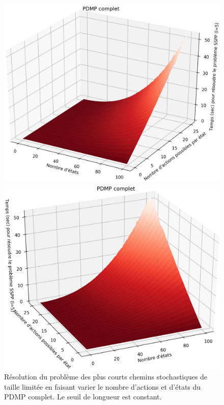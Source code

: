 \documentclass[12pt,a4paper]{report}
\theoremstyle{definition}%
\theoremstyle{remark}
\begin{document}
\begin{figure}[H]
	\centering
	\captionsetup{justification=centering}
	\begin{minipage}[b]{0.45\textwidth}
		\includegraphics[scale=0.4]{figures/sspp3.png}
	\end{minipage}
	\hspace{0.05\textwidth}
	\begin{minipage}[b]{0.45\textwidth}
		\includegraphics[scale=0.4]{figures/sspp2.png}
	\end{minipage}
	\caption{\footnotesize Résolution du problème des plus courts chemins stochastiques de taille limitée en faisant varier le nombre d'actions et d'états du PDMP complet. Le seuil de longueur est constant.}
		\label{graphic2}
\end{figure}
\end{document}
